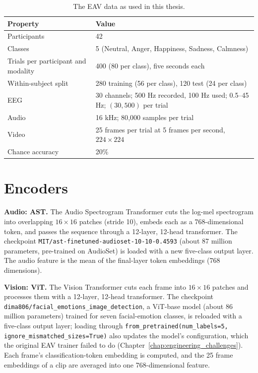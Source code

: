 \begin{table}[htbp]
\centering
\small
\caption{The EAV data as used in this thesis.}
\label{tab:eav_dataset_structure}
\begin{tabular}{p{5.2cm} p{8.2cm}}
\hline
\textbf{Property} & \textbf{Value} \\
\hline
Participants & 42 \\
Classes & 5 (Neutral, Anger, Happiness, Sadness, Calmness) \\
Trials per participant and modality & 400 (80 per class), five seconds each \\
Within-subject split & 280 training (56 per class), 120 test (24 per class) \\
EEG & 30 channels; 500 Hz recorded, 100 Hz used; 0.5--45 Hz; $(30, 500)$ per trial \\
Audio & 16 kHz; 80{,}000 samples per trial \\
Video & 25 frames per trial at 5 frames per second, $224\times224$ \\
Chance accuracy & 20\% \\
\hline
\end{tabular}
\end{table}

\section{Encoders}

\textbf{Audio: AST.} The Audio Spectrogram Transformer \cite{Gong2021AST} cuts the log-mel spectrogram into overlapping $16\times16$ patches (stride 10), embeds each as a 768-dimensional token, and passes the sequence through a 12-layer, 12-head transformer. The checkpoint \texttt{MIT/ast-finetuned-audioset-10-10-0.4593} (about 87 million parameters, pre-trained on AudioSet) is loaded with a new five-class output layer. The audio feature is the mean of the final-layer token embeddings (768 dimensions).

\textbf{Vision: ViT.} The Vision Transformer \cite{Dosovitskiy2021ViT} cuts each frame into $16\times16$ patches and processes them with a 12-layer, 12-head transformer. The checkpoint \texttt{dima806/facial\_emotions\_image\_detection}, a ViT-base model (about 86 million parameters) trained for seven facial-emotion classes, is reloaded with a five-class output layer; loading through \texttt{from\_pretrained(num\_labels=5, ignore\_mismatched\_sizes=True)} also updates the model's configuration, which the original EAV trainer failed to do (Chapter~\ref{chap:engineering_challenges}). Each frame's classification-token embedding is computed, and the 25 frame embeddings of a clip are averaged into one 768-dimensional feature.

